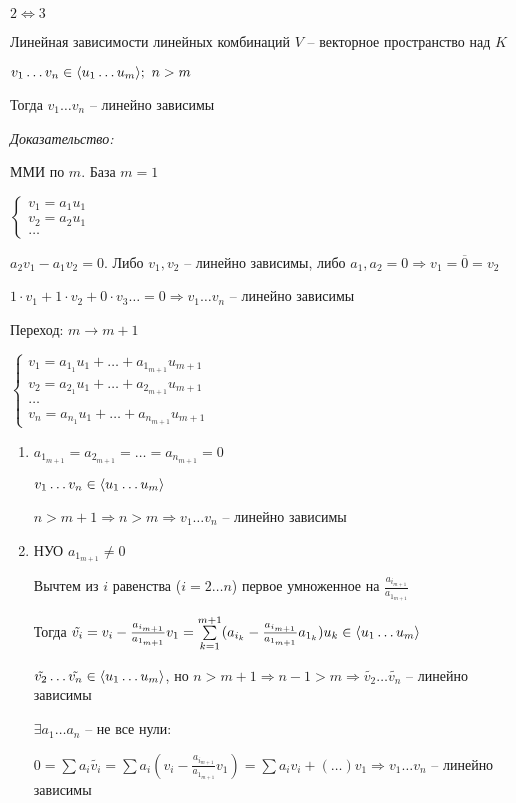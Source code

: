 \documentclass[12pt]{article}
\begin{document}
\begin{Exercise}{}
    $2 \Leftrightarrow 3$
\end{Exercise}

\begin{lem}{Линейная зависимости линейных комбинаций}
    $V$ -- векторное пространство над $K$

    $v_1 \ldots v_n \in \langle u_1 \ldots u_m \rangle;\ n > m$

    Тогда $v_1 \ldots v_n$ -- линейно зависимы
\end{lem}

\textit{Доказательство:}

ММИ по $m$. База $m = 1$

$\begin{cases}
    v_1 = a_1u_1 \\
    v_2 = a_2u_1 \\
    \ldots
\end{cases}$

$a_2v_1 - a_1v_2 = 0$. Либо $v_1, v_2$ -- линейно зависимы, либо $a_1, a_2 = 0 \Rightarrow v_1 = \overline{0} = v_2$

$1 \cdot v_1 + 1 \cdot v_2 + 0 \cdot v_3 \ldots = 0 \Rightarrow v_1 \ldots v_n$ -- линейно зависимы

Переход: $m \rightarrow m + 1$

$\begin{cases}
    v_1 = a_{1_1}u_1 + \ldots + a_{1_{m + 1}}u_{m + 1} \\
    v_2 = a_{2_1}u_1 + \ldots + a_{2_{m + 1}}u_{m + 1} \\
    \ldots \\
    v_n = a_{n_1}u_1 + \ldots + a_{n_{m + 1}}u_{m + 1}
\end{cases}$

\begin{enumerate}
    \item $a_{1_{m + 1}} = a_{2_{m + 1}} = \ldots = a_{n_{m + 1}} = 0$

    $v_1 \ldots v_n \in \langle u_1 \ldots u_m \rangle$

    $n > m + 1 \Rightarrow n > m \Rightarrow v_1 \ldots v_n$ -- линейно зависимы

    \item НУО $a_{1_{m + 1}} \neq 0$
    
    Вычтем из $i$ равенства ($i = 2 \ldots n$) первое умноженное на $\frac{a_{i_{m + 1}}}{a_{1_{m + 1}}}$

    Тогда $\tilde{v_i} = v_i - \frac{a_{i_{m + 1}}}{a_{1_{m + 1}}}v_1 = \sum\limits_{k = 1}^{m + 1} (a_{i_k} - \frac{a_{i_{m + 1}}}{a_{1_{m + 1}}}a_{1_k})u_k \in \langle u_1 \ldots u_m \rangle$

    $\tilde{v_2} \ldots \tilde{v_n} \in \langle u_1 \ldots u_m \rangle$, но $n > m + 1 \Rightarrow n - 1 > m \Rightarrow \tilde{v_2} \ldots \tilde{v_n}$ -- линейно зависимы

    $\exists a_1 \ldots a_n$ -- не все нули:

    $0 = \sum a_i \tilde{v_i} = \sum a_i(v_i - \frac{a_{i_{m + 1}}}{a_{1_{m + 1}}}v_1) = \sum a_iv_i + (\ldots)v_1 \Rightarrow v_1 \ldots v_n$ -- линейно зависимы
\end{enumerate}
\end{document}
